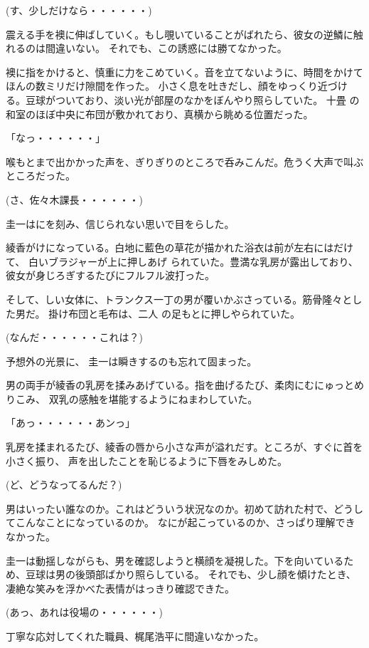 ﻿\documentclass[book,tate]{jlreq}
\begin{document}
(す、少しだけなら・・・・・・)

震える手を襖に伸ばしていく。もし覗いていることがばれたら、彼女の逆鱗に触れるのは間違いない。
それでも、この誘惑には勝てなかった。

襖に指をかけると、慎重に力をこめていく。音を立てないように、時間をかけてほんの数ミリだけ隙間を作った。
小さく息を吐きだし、顔をゆっくり近づける。豆球がついており、淡い光が部屋のなかをぼんやり照らしていた。
十畳 の和室のほぼ中央に布団が敷かれており、真横から眺める位置だった。

「なっ・・・・・・」

喉もとまで出かかった声を、ぎりぎりのところで呑みこんだ。危うく大声で叫ぶところだった。

(さ、佐々木課長・・・・・・)

圭一はにを刻み、信じられない思いで目をらした。

綾香がけになっている。白地に藍色の草花が描かれた浴衣は前が左右にはだけて、
白いブラジャーが上に押しあげ られていた。豊満な乳房が露出しており、彼女が身じろぎするたびにフルフル波打った。

そして、しい女体に、トランクス一丁の男が覆いかぶさっている。筋骨隆々とした男だ。
掛け布団と毛布は、二人 の足もとに押しやられていた。

(なんだ・・・・・・これは？)

予想外の光景に、 圭一は瞬きするのも忘れて固まった。

男の両手が綾香の乳房を揉みあげている。指を曲げるたび、柔肉にむにゅっとめりこみ、
双乳の感触を堪能するようにねまわしていた。

「あっ・・・・・・あンっ」

乳房を揉まれるたび、綾香の唇から小さな声が溢れだす。ところが、すぐに首を小さく振り、
声を出したことを恥じるように下唇をみしめた。

(ど、どうなってるんだ？)

男はいったい誰なのか。これはどういう状況なのか。初めて訪れた村で、どうしてこんなことになっているのか。
なにが起こっているのか、さっぱり理解できなかった。

圭一は動揺しながらも、男を確認しようと横顔を凝視した。下を向いているため、豆球は男の後頭部ばかり照らしている。
それでも、少し顔を傾けたとき、凄絶な笑みを浮かべた表情がはっきり確認できた。

(あっ、あれは役場の・・・・・・)

丁寧な応対してくれた職員、梶尾浩平に間違いなかった。
\end{document}
